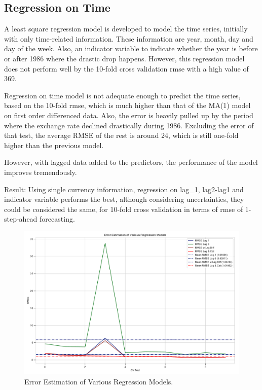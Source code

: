 \documentclass[]{article}
\begin{document}
\subsection{Regression on Time}
A least square regression model is developed to model the time series, initially with only time-related information. These information are year, month, day and day of the week. Also, an indicator variable to indicate whether the year is before or after 1986 where the drastic drop happens. However, this regression model does not perform well by the 10-fold cross validation rmse with a high value of 369. 

Regression on time model is not adequate enough to predict the time series, based on the 10-fold rmse, which is much higher than that of the MA(1) model on first order differenced data. Also, the error is heavily pulled up by the period where the exchange rate declined drastically during 1986. Excluding the error of that test, the average RMSE of the rest is around 24, which is still one-fold higher than the previous model.

However, with lagged data added to the predictors, the performance of the model improves tremendously. 

Result: Using single currency information, regression on lag\_1, lag2-lag1 and indicator variable performs the best, although considering uncertainties, they could be considered the same, for 10-fold cross validation in terms of rmse of 1-step-ahead forecasting. 

%
\begin{figure}[hbtp]
	\centering
	\includegraphics[width=1\columnwidth]{../Figures/error_estimation_3.pdf}
	\caption{Error Estimation of Various Regression Models.}
	\label{fig:error_estimation_3}
\end{figure}
%
\end{document}
